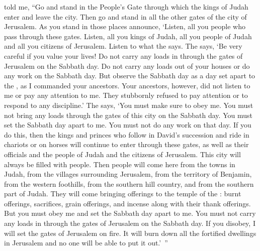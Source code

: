 {{}
told
me,
“Go
and stand
in the People’s
Gate
through which
the kings
of Judah
enter
and leave
the city. Then go and stand in all
the other gates
of the city of Jerusalem.
As you stand in those
places announce,
‘Listen,
all
you people who
pass
through these
gates.
Listen, all you kings
of Judah,
all
you people of Judah
and all
you citizens
of Jerusalem.
Listen
to what
the {} says.
The
{}
says,
‘Be very careful
if you value your lives! Do not
carry
any loads
in through
the gates
of Jerusalem
on the Sabbath
day.
Do not
carry any loads
out
of your houses
or
do
any
work
on the Sabbath
day.
But observe
the Sabbath
day
as
a day set apart
to the
{}, as I commanded
your ancestors.
Your ancestors,
however,
did not
listen
to me or pay
any attention
to me. They stubbornly
refused to pay attention
or to respond
to any
discipline.’
The
{}
says, ‘You must make sure to
obey
me. You must not
bring
any loads
through the gates
of this
city
on the Sabbath
day.
You must set the Sabbath
day
apart
to me. You must not
do
any
work on that day.
If you do this,
then the kings
and princes
who
follow in
David’s
succession
and ride
in chariots
or on horses
will continue to enter
through these
gates,
as well as their
officials
and the people
of Judah
and the citizens
of Jerusalem.
This
city
will always be filled with people.
Then people will come
here from the towns
in Judah,
from the villages surrounding
Jerusalem,
from the territory
of Benjamin,
from
the western foothills,
from
the southern hill country,
and from
the southern
part of Judah. They will come
bringing
offerings to the temple
of the {}: burnt offerings,
sacrifices,
grain offerings,
and incense
along with their thank offerings.
But you
must
obey
me and set
the
Sabbath
day
apart
to me. You must not
carry
any loads
in through the gates
of Jerusalem
on the Sabbath
day.
If you disobey, I will set
the gates
of Jerusalem on fire.
It will burn down
all the fortified dwellings
in Jerusalem
and no one
will be able to put it out.’ ”

}
